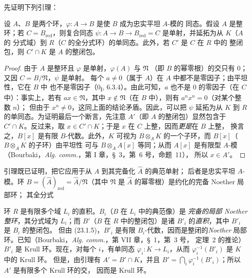 先证明下列引理：

\begin{lemma}[23.2.7.1]
\label{0.23.2.7.1-fr}
设 $A$、$B$ 是两个环，$\varphi:A\to B$ 是使 $B$ 成为忠实平坦 $A$-模的
同态。假设 $A$ 是整环；若 $C=B_{\mathrm{red}}$，则复合同态
$\psi:A\to B\to B_{\mathrm{red}}=C$ 是单射，并延拓为从 $K$（$A$ 的
分式域）到 $R$（$C$ 的全分式环）的单同态。此外，若 $C'$ 是 $C$ 在 $R$ 中的
整闭包，则 $C'\cap K$ 是 $A$ 的整闭包。
\end{lemma}

\begin{proof}
由于 $A$ 是整环且 $\varphi$ 是单射，$\varphi(A)$ 与 $\mathfrak N$
（即 $B$ 的幂零根）的交只有 $0$；又因 $C=B/\mathfrak N$，$\psi$ 是单射。
每个 $a\neq0$（属于 $A$）在 $A$ 中都不是零因子；由平坦性，它在 $B$ 中
也不是零因子（0\textsubscript{I}, 6.3.4）。由此可知，$a$ 也不是
$0$ 的零因子（在 $C$ 中）：事实上，若有 $ax\in\mathfrak N$，其中
$x\notin\mathfrak N$（在 $B$ 中），则有 $a^nx^n=0$（对某个整数 $n$）；
但由于 $x^n\neq0$，这同上面的结论矛盾。因此，可以把
$\psi$ 延拓为从 $K$ 到 $R$ 的单同态。为证明最后一个断言，先注意
$A'$（即 $A$ 的整闭包）显然包含于 $C'\cap K$。反过来，取
$x\in C'\cap K$；于是 $x$ 在 $C$ 上整，因而\emph{更是}在 $B$ 上整，
换言之，$B[x]$ 是有限 $B$-代数。此外，$K$ 可视为
$B\otimes_AK$ 的一个子环，而 $B[x]$（$B\otimes_AK$ 的子环）由平坦性
可与 $B\otimes_AA[x]$ 等同；从而 $A[x]$ 是有限型 $A$-模
（Bourbaki，\emph{Alg. comm.}，第 I 章，§~3，第~6 号，命题~11），
所以 $x\in A'$。
\end{proof}

引理既已证明，把它应用于从 $A$ 到其完备化 $\widehat A$ 的典范单射；
后者是忠实平坦 $A$-模。环
$B=(\widehat A)_{\mathrm{red}}=\widehat A/\mathfrak N$（其中
$\mathfrak N$ 是 $\widehat A$ 的幂零根）是约化的完备 Noether 局部环；
其全分式


环 $R$ 是有限多个域 $L_i$ 的直积。$B_i$（$B$ 在 $L_i$ 中的典范像）是
\emph{完备的局部 Noether 整环}，其分式域为 $L_i$；而 $B'$（$B$ 在
$R$ 中的整闭包）是诸 $B'_i$ 的\emph{直积}，其中 $B'_i$ 是 $B_i$ 的整闭包。
但由 (23.1.5)，$B'_i$ 是有限 $B_i$-代数，因而是整闭的\emph{Noether}
局部环。已知（Bourbaki，\emph{Alg. comm.}，第 VII 章，§~1，第~3 号，
定理~2 的推论）$B'_i$ 是 Krull 环。现在，对每个 $i$，有单同态
$\varphi_i:K\to L_i$，从而 $\varphi_i^{-1}(B'_i)$ 是 $K$ 中的 Krull 环。
但是，由引理有 $A'=B'\cap K$，并且
$B'=\bigcap_i\varphi_i^{-1}(B'_i)$；所以 $A'$ 是有限多个 Krull 环的交，
因而是 Krull 环。

